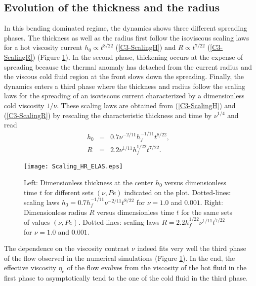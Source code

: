 \subsection{Evolution of the thickness and the radius}
\label{C3-sec:evol-thickn-radi-e}

In this bending  dominated regime, the dynamics  shows three different
spreading phases.   The thickness as  well as the radius  first follow
the   isoviscous   scaling   laws   for  a   hot   viscosity   current
$h_0\propto  t^{8/22}$  (\ref{C3-ScalingH})  and  $R\propto  t^{7/22}$
(\ref{C3-ScalingR}) (Figure \ref{C3-Scaling_HR_ELAS}).   In the second
phase,  thickening occurs  at  the expense  of  spreading because  the
thermal anomaly has  detached from the current radius  and the viscous
cold fluid region at the front slows down the spreading.  Finally, the
dynamics enters  a third phase  where the thickness and  radius follow
the  scaling  laws   for  the  spreading  of   an  isoviscous  current
characterized by a dimensionless cold viscosity $1/\nu$. These scaling
laws are obtained from  (\ref{C3-ScalingH}) and (\ref{C3-ScalingR}) by
rescaling  the characteristic  thickness and  time by  $\nu^{1/4}$ and
read
\begin{eqnarray}
  h_{0} & = &0.7 \nu^{-2/11} h_f^{-1/11}t^{8/22}\label{C3-ScalingH-Visco},\\
  R& = & 2.2 \nu^{1/11}h_f^{1/22} t^{7/22}\label{C3-ScalingR-Visco}.
\end{eqnarray}
\begin{figure}[h!]
  \begin{center}
    \graphicspath{ {/Users/thorey/Documents/These/Projet/Refroidissement/Skin_Model/Figure/JFM_V13/} }
    \texttt{[image: Scaling\_HR\_ELAS.eps]}
    \caption{Left: Dimensionless thickness at  the center $h_0$ versus
      dimensionless time  $t$ for different sets  $(\nu,Pe)$ indicated
      on      the      plot.      Dotted-lines:      scaling      laws
      $h_0=  0.7h_f^{-1/11}\nu^{-2/11}t^{8/22}$ for  $\nu  = 1.0$  and
      $0.001$.  Right:  Dimensionless radius $R$  versus dimensionless
      time $t$ for the same  sets of values $(\nu,Pe)$.  Dotted-lines:
      scaling    laws    $R=   2.2h_f^{1/22}\nu^{1/11}t^{7/22}$    for
      $\nu = 1.0$ and $0.001$.}
    \label{C3-Scaling_HR_ELAS}
  \end{center}
\end{figure}
The dependence on  the viscosity contrast $\nu$ indeed  fits very well
the  third phase  of the  flow observed  in the  numerical simulations
(Figure   \ref{C3-Scaling_HR_ELAS}).   In   the  end,   the  effective
viscosity $\eta_e$ of  the flow evolves from the viscosity  of the hot
fluid in the first phase to asymptotically tend to the one of the cold
fluid in the third phase.

